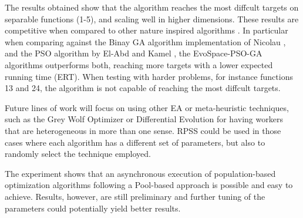 \documentclass[sigconf]{acmart}
\begin{document}
The results obtained show that the algorithm reaches the most diffcult 
targets on separable functions (1-5), and scaling well in 
higher dimensions. These results are competitive 
when compared to other nature inspired algorithms \cite{hansen2010bbob}.
In particular when comparing against the Binay GA algorithm implementation 
of Nicolau \cite{nicolau2009application}, and the PSO algorithm by 
El-Abd and Kamel \cite{el2009black}, the EvoSpace-PSO-GA 
algorithms outperforms both, reaching more targets with a lower expected 
running time (ERT). When testing with harder problems, for instance functions 
13 and 24, the algorithm is not capable of reaching the most diffcult targets. 

Future lines of work will focus on using other EA or 
meta-heuristic techniques, such as the Grey Wolf Optimizer \cite{mirjalili2014grey}
or Differential Evolution \cite{storn1997differential} for having workers that are 
heterogeneous in more than one sense. RPSS could be used 
in those cases where each algorithm has a different set of 
parameters, but also to randomly select the technique employed.

The experiment shows that an asynchronous execution of population-based optimization algorithms 
following a Pool-based approach is possible and easy to achieve.
Results, however, are still preliminary and further tuning of the parameters could 
potentially yield better results. 


 

\clearpage %
\end{document}
